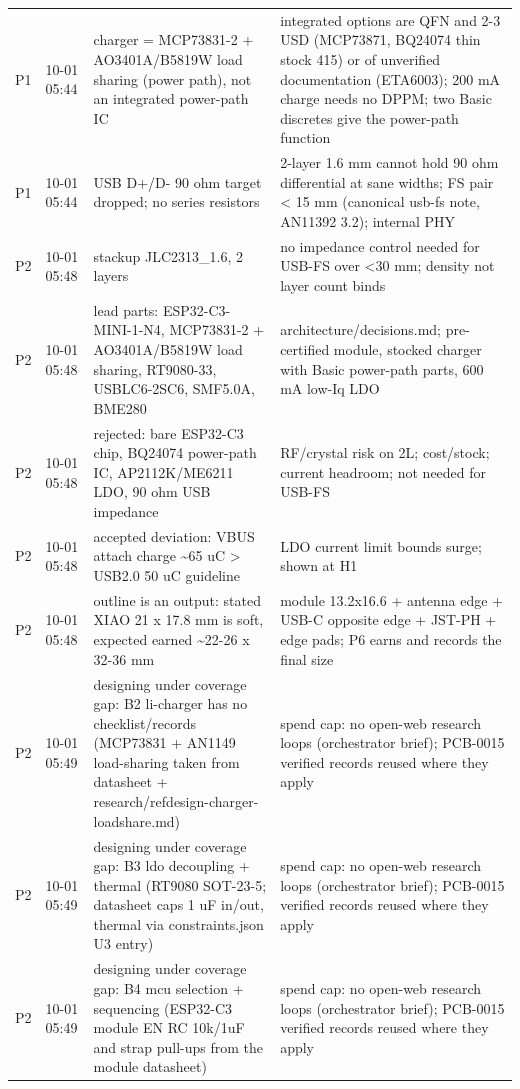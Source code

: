 \documentclass[11pt]{article}
\begin{document}
{\begin{longtable}{lp{1.6cm}p{6.2cm}p{6.2cm}}
P1 & 10-01 05:44 & charger = MCP73831-2 + AO3401A/B5819W load sharing (power path), not an integrated power-path IC & integrated options are QFN and 2-3 USD (MCP73871, BQ24074 thin stock 415) or of unverified documentation (ETA6003); 200 mA charge needs no DPPM; two Basic discretes give the power-path function \\
P1 & 10-01 05:44 & USB D+/D- 90 ohm target dropped; no series resistors & 2-layer 1.6 mm cannot hold 90 ohm differential at sane widths; FS pair \textless{} 15 mm (canonical usb-fs note, AN11392 3.2); internal PHY \\
P2 & 10-01 05:48 & stackup JLC2313\_1.6, 2 layers & no impedance control needed for USB-FS over \textless{}30 mm; density not layer count binds \\
P2 & 10-01 05:48 & lead parts: ESP32-C3-MINI-1-N4, MCP73831-2 + AO3401A/B5819W load sharing, RT9080-33, USBLC6-2SC6, SMF5.0A, BME280 & architecture/decisions.md; pre-certified module, stocked charger with Basic power-path parts, 600 mA low-Iq LDO \\
P2 & 10-01 05:48 & rejected: bare ESP32-C3 chip, BQ24074 power-path IC, AP2112K/ME6211 LDO, 90 ohm USB impedance & RF/crystal risk on 2L; cost/stock; current headroom; not needed for USB-FS \\
P2 & 10-01 05:48 & accepted deviation: VBUS attach charge \textasciitilde{}65 uC \textgreater{} USB2.0 50 uC guideline & LDO current limit bounds surge; shown at H1 \\
P2 & 10-01 05:48 & outline is an output: stated XIAO 21 x 17.8 mm is soft, expected earned \textasciitilde{}22-26 x 32-36 mm & module 13.2x16.6 + antenna edge + USB-C opposite edge + JST-PH + edge pads; P6 earns and records the final size \\
P2 & 10-01 05:49 & designing under coverage gap: B2 li-charger has no checklist/records (MCP73831 + AN1149 load-sharing taken from datasheet + research/refdesign-charger-loadshare.md) & spend cap: no open-web research loops (orchestrator brief); PCB-0015 verified records reused where they apply \\
P2 & 10-01 05:49 & designing under coverage gap: B3 ldo decoupling + thermal (RT9080 SOT-23-5; datasheet caps 1 uF in/out, thermal via constraints.json U3 entry) & spend cap: no open-web research loops (orchestrator brief); PCB-0015 verified records reused where they apply \\
P2 & 10-01 05:49 & designing under coverage gap: B4 mcu selection + sequencing (ESP32-C3 module EN RC 10k/1uF and strap pull-ups from the module datasheet) & spend cap: no open-web research loops (orchestrator brief); PCB-0015 verified records reused where they apply \\

\end{longtable}}
\end{document}
